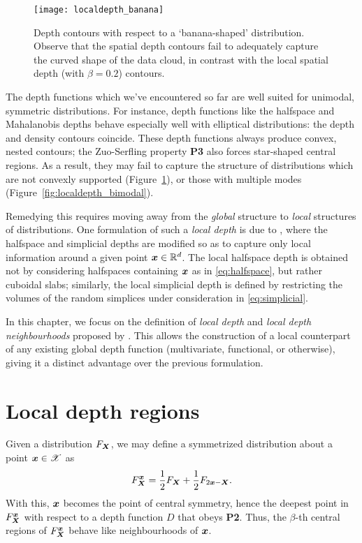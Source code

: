 

\begin{figure}
    \centering
    \texttt{[image: localdepth\_banana]}
    \caption{
        Depth contours with respect to a `banana-shaped' distribution.
        Observe that the spatial depth contours fail to adequately capture the
        curved shape of the data cloud, in contrast with the local spatial
        depth (with $\beta = 0.2$) contours.
    }
    \label{fig:localdepth_banana}
\end{figure}


The depth functions which we've encountered so far are well suited for
unimodal, symmetric distributions.
For instance, depth functions like the halfspace and Mahalanobis depths behave
especially well with elliptical distributions: the depth and density contours
coincide.
These depth functions always produce convex, nested contours; the Zuo-Serfling
property \textbf{P3} also forces star-shaped central regions.
As a result, they may fail to capture the structure of distributions which are
not convexly supported (Figure~\ref{fig:localdepth_banana}), or those with
multiple modes (Figure~\ref{fig:localdepth_bimodal}).

Remedying this requires moving away from the \emph{global} structure to
\emph{local} structures of distributions.
One formulation of such a \emph{local depth} is due to
\textcite{agostinelli-romanazzi-2011}, where the halfspace and simplicial
depths are modified so as to capture only local information around a given
point $\bm{x} \in \mathbb{R}^d$.
The local halfspace depth is obtained not by considering halfspaces containing
$\bm{x}$ as in \ref{eq:halfspace}, but rather cuboidal slabs; similarly, the
local simplicial depth is defined by restricting the volumes of the random
simplices under consideration in \ref{eq:simplicial}.

In this chapter, we focus on the definition of \emph{local depth} and
\emph{local depth neighbourhoods} proposed by
\textcite{paindaveine-bever-2013}.
This allows the construction of a local counterpart of any existing global
depth function (multivariate, functional, or otherwise), giving it a distinct
advantage over the previous formulation.



\section{Local depth regions}

Given a distribution $F_{\bm{X}}$, we may define a symmetrized distribution about
a point $\bm{x} \in \mathscr{X}$ as
\begin{equation}
    F^{\bm{x}}_{\bm{X}} = \frac{1}{2}F_{\bm{X}} + \frac{1}{2}F_{2\bm{x} - \bm{X}}. \label{eq:local_symmetrization}
\end{equation}
With this, $\bm{x}$ becomes the point of central symmetry, hence the deepest
point in $F^{\bm{x}}_{\bm{X}}$ with respect to a depth function $D$ that obeys
\textbf{P2}.
Thus, the $\beta$-th central regions of $F^{\bm{x}}_{\bm{X}}$ behave like
neighbourhoods of $\bm{x}$.

